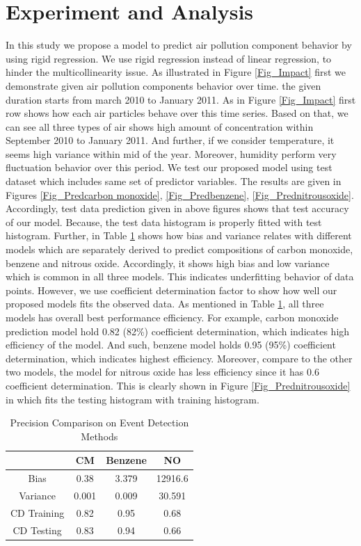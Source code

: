 \section{Experiment and Analysis} \label{sec-experiment}
In this study we propose a model to 
predict air pollution component behavior by using rigid regression. 
We use rigid regression instead of linear regression,
to hinder the multicollinearity issue. 
As illustrated in Figure \ref{Fig_Impact} first we 
demonstrate given air pollution components behavior over time.
the given duration starts from march 2010 to January 2011.
As in Figure \ref{Fig_Impact} first row shows how each 
air particles behave over this time series. 
Based on that, we can see all three types of air shows 
high amount of concentration within September 2010 to January 2011.
And further, if we consider temperature, it seems high variance within mid of the year.
Moreover, humidity perform very fluctuation behavior over this period.
We test our proposed model using test dataset which 
includes same set of predictor variables.
The results are given in Figures \ref{Fig_Predcarbon monoxide}, \ref{Fig_Predbenzene}, \ref{Fig_Prednitrousoxide}.
Accordingly, test data prediction given in above 
figures shows that test accuracy of our model. 
Because, the test data histogram is properly fitted with test histogram.
Further, in Table \ref{tbl:overall-experiments} shows how bias and variance relates with 
different models which are separately derived to 
predict compositions of carbon monoxide, benzene and nitrous oxide.
Accordingly, it shows high bias and low variance which is common in all three models.
This indicates underfitting behavior of data points.
However, we use coefficient determination factor to 
show how well our proposed models fits the observed data. 
As mentioned in Table \ref{tbl:overall-experiments}, 
all three models has overall best performance efficiency. 
For example, carbon monoxide prediction model hold 0.82 (82\%) coefficient determination, which indicates high efficiency of the model.
And such, benzene model holds 0.95 (95\%) coefficient determination, which indicates highest efficiency.
Moreover, compare to the other two models, the model for nitrous oxide has less efficiency since it has 0.6 coefficient determination. 
This is clearly shown in Figure \ref{Fig_Prednitrousoxide} in which fits the testing histogram with training histogram.

\begin{table}  \centering
  \caption{Precision Comparison on Event Detection Methods}
  \label{tbl:overall-experiments}
  \begin{tabular}{cccc}
\toprule
    & CM & Benzene &NO \\
\midrule
Bias & 0.38 & 3.379 & 12916.6 \\
Variance & 0.001 & 0.009 & 30.591 \\
CD Training & 0.82 & 0.95 & 0.68 \\
CD Testing & 0.83 & 0.94 & 0.66 \\
\bottomrule
\end{tabular}
\end{table}



